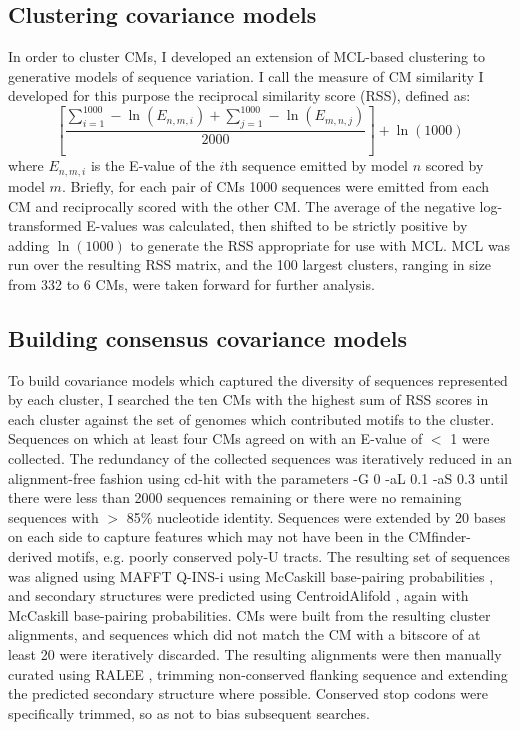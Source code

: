 \subsection{Clustering covariance models}

In order to cluster CMs, I developed an extension of MCL-based clustering \parencite{Enright2002} to generative models of sequence variation. I call the measure of CM similarity I developed for this purpose the reciprocal similarity score (RSS), defined as: \[ \left[\frac{\sum_{i=1}^{1000} -\ln{(E_{n,m,i})} +  \sum_{j=1}^{1000} -\ln{(E_{m,n,j})}}{2000}\right] + \ln(1000) \] where $E_{n,m,i}$ is the E-value of the $i$th sequence emitted by model $n$ scored by model $m$. Briefly, for each pair of CMs 1000 sequences were emitted from each CM and reciprocally scored with the other CM. The average of the negative log-transformed E-values was calculated, then shifted to be strictly positive by adding $\ln(1000)$ to generate the RSS appropriate for use with MCL. MCL was run over the resulting RSS matrix, and the 100 largest clusters, ranging in size from 332 to 6 CMs, were taken forward for further analysis.

\subsection{Building consensus covariance models}

To build covariance models which captured the diversity of sequences represented by each cluster, I searched the ten CMs with the highest sum of RSS scores in each cluster against the set of genomes which contributed motifs to the cluster. Sequences on which at least four CMs agreed on with an E-value of $<$ 1 were collected. The redundancy of the collected sequences was iteratively reduced in an alignment-free fashion using cd-hit \parencite{Li2006} with the parameters -G 0 -aL 0.1 -aS 0.3 until there were less than 2000 sequences remaining or there were no remaining sequences with $>$ 85\% nucleotide identity. Sequences were extended by 20 bases on each side to capture features which may not have been in the CMfinder-derived motifs, e.g. poorly conserved poly-U tracts. The resulting set of sequences was aligned using MAFFT Q-INS-i \parencite{Katoh2008} using McCaskill base-pairing probabilities \parencite{McCaskill1990}, and secondary structures were predicted using CentroidAlifold \parencite{Hamada2009}, again with McCaskill base-pairing probabilities. CMs were built from the resulting cluster alignments, and sequences which did not match the CM with a bitscore of at least 20 were iteratively discarded. The resulting alignments were then manually curated using RALEE \parencite{Griffiths-Jones2005}, trimming non-conserved flanking sequence and extending the predicted secondary structure where possible. Conserved stop codons were specifically trimmed, so as not to bias subsequent searches.


